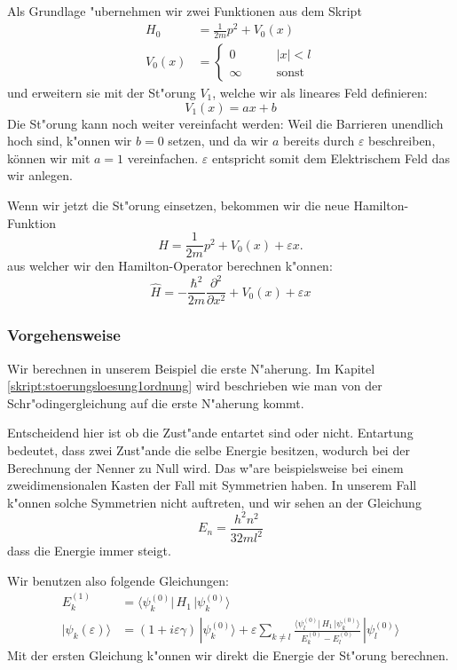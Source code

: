 \begin{refsection}
Als Grundlage "ubernehmen wir zwei Funktionen aus dem Skript
\begin{equation}
\begin{aligned}
H_0&=\frac1{2m}p^2+V_0(x)
\\
V_0(x)&=
  \begin{cases}
    0       & \qquad |x|<l\\
    \infty  & \qquad\text{sonst}
  \end{cases}
\end{aligned}
\end{equation}
und erweitern sie mit der St"orung $V_1$, welche wir als lineares Feld definieren:
\begin{equation}
  V_1(x) = a x + b
\end{equation}
Die St"orung kann noch weiter vereinfacht werden:
Weil die Barrieren unendlich hoch sind, k"onnen wir $b = 0$ setzen,
und da wir $a$ bereits durch $\varepsilon$ beschreiben, k\"onnen wir mit $a = 1$ vereinfachen.
$\varepsilon$ entspricht somit dem Elektrischem Feld das wir anlegen.


Wenn wir jetzt die St"orung einsetzen, bekommen wir die neue Hamilton-Funktion
\[
  H=\frac1{2m}p^2+V_0(x)
    + \varepsilon x.
\]
aus welcher wir den Hamilton-Operator berechnen k"onnen:
\[
  \hat{H} = -\frac{\hbar^2}{2m} \frac{\partial^2}{\partial x^2} + V_0(x) + \varepsilon x
\]

\subsubsection{Vorgehensweise}
Wir berechnen in unserem Beispiel die erste N"aherung.
Im Kapitel \ref{skript:stoerungsloesung1ordnung} wird beschrieben wie man von der Schr"odingergleichung 
auf die erste N"aherung kommt.

Entscheidend hier ist ob die Zust"ande entartet sind oder nicht.
Entartung bedeutet, dass zwei Zust"ande die selbe Energie besitzen, 
wodurch bei der Berechnung der Nenner zu Null wird.
Das w"are beispielsweise bei einem zweidimensionalen Kasten der Fall mit Symmetrien haben.
In unserem Fall k"onnen solche Symmetrien nicht auftreten,
und wir sehen an der Gleichung
\[
  E_n = \frac{h^2n^2}{32ml^2}
\]
dass die Energie immer steigt.

Wir benutzen also folgende Gleichungen:
\begin{equation}
\begin{aligned}
E_k^{(1)} &=
\langle \psi_k^{(0)}|\, H_1 \,|\psi_k^{(0)}\rangle
\\
|\psi_k(\varepsilon)\rangle &=
(1+i\varepsilon \gamma)
\,|\psi_k^{(0)}\rangle
+
\varepsilon
\sum_{k\ne l}
\frac{\langle \psi_l^{(0)}|\, H_1 \,|\psi_k^{(0)}\rangle}{E_k^{(0)}-E_l^{(0)}}
\,
|\psi_l^{(0)}\rangle
\label{eq:efeld_ESkalarprodukt}
\end{aligned}
\end{equation}
Mit der ersten Gleichung k"onnen wir direkt die Energie der St"orung berechnen.


\end{refsection}

